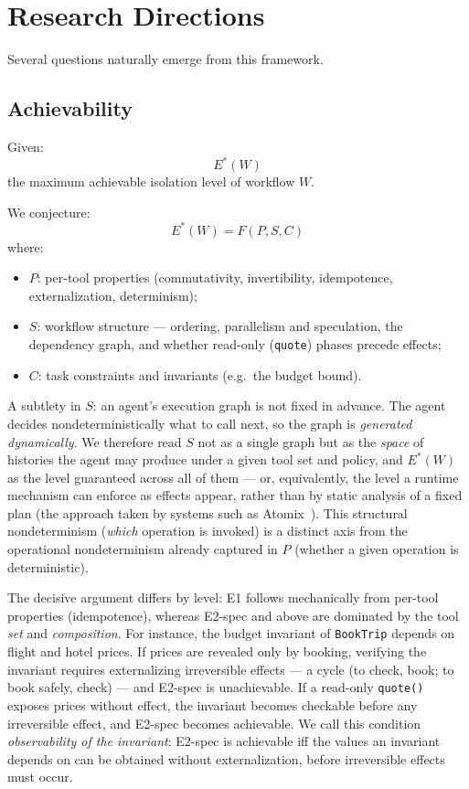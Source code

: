 \documentclass[11pt]{article}
\begin{document}
\section{Research Directions}

Several questions naturally emerge from this framework.

\subsection{Achievability}

Given:
\[
E^*(W)
\]
the maximum achievable isolation level of workflow $W$.

We conjecture:
\[
E^*(W) = F(P, S, C)
\]
where:

\begin{itemize}
\item $P$: per-tool properties (commutativity, invertibility, idempotence,
externalization, determinism);
\item $S$: workflow structure --- ordering, parallelism and speculation,
the dependency graph, and whether read-only (\texttt{quote}) phases precede
effects;
\item $C$: task constraints and invariants (e.g.\ the budget bound).
\end{itemize}

A subtlety in $S$: an agent's execution graph is not fixed in advance. The
agent decides nondeterministically what to call next, so the graph is
\emph{generated dynamically}. We therefore read $S$ not as a single graph
but as the \emph{space} of histories the agent may produce under a given
tool set and policy, and $E^*(W)$ as the level guaranteed across all of
them --- or, equivalently, the level a runtime mechanism can enforce as
effects appear, rather than by static analysis of a fixed plan (the
approach taken by systems such as Atomix~\cite{mohammadi2026atomix}). This structural nondeterminism
(\emph{which} operation is invoked) is a distinct axis from the operational
nondeterminism already captured in $P$ (whether a given operation is
deterministic).

The decisive argument differs by level: E1 follows mechanically from
per-tool properties (idempotence), whereas E2-spec and above are dominated by
the tool \emph{set} and \emph{composition}. For instance, the budget
invariant of \texttt{BookTrip} depends on flight and hotel prices. If
prices are revealed only by booking, verifying the invariant requires
externalizing irreversible effects --- a cycle (to check, book; to book
safely, check) --- and E2-spec is unachievable. If a read-only
\texttt{quote()} exposes prices without effect, the invariant becomes
checkable before any irreversible effect, and E2-spec becomes achievable. We
call this condition \emph{observability of the invariant}: E2-spec is
achievable iff the values an invariant depends on can be obtained without
externalization, before irreversible effects must occur.
\end{document}
